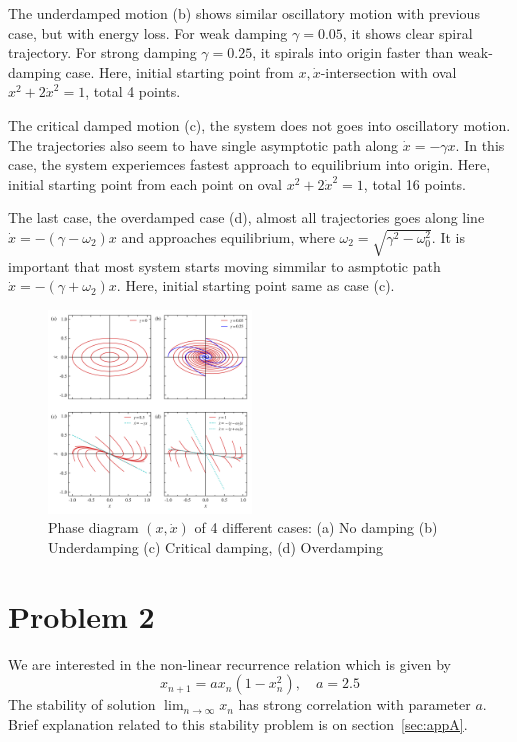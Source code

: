 \documentclass[reprint, nofootinbib]{revtex4-2} %
\begin{document}
The underdamped motion (b) shows similar oscillatory motion with previous case, but with energy loss. For weak damping $\gamma=0.05$, it shows clear spiral trajectory. For strong damping $\gamma=0.25$, it spirals into origin faster than weak-damping case. Here, initial starting point from $x, \dot{x}$-intersection with oval $x^2+2\dot{x}^2=1$, total 4 points.

The critical damped motion (c), the system does not goes into oscillatory motion. The trajectories also seem to have single asymptotic path along $\dot{x} = -\gamma x$. In this case, the system experiemces fastest approach to equilibrium into origin. Here, initial starting point from each point on oval $x^2+2\dot{x}^2=1$, total 16 points.

The last case, the overdamped case (d), almost all trajectories goes along line $\dot{x} = -(\gamma-\omega_2)x$ and approaches equilibrium, where $\omega_2 = \sqrt{\gamma^2-\omega_0^2}$. It is important that most system starts moving simmilar to asmptotic path $\dot{x} = -(\gamma+\omega_2)x$. Here, initial starting point same as case (c).

\begin{figure}[t]
	\includegraphics[width=0.48\textwidth]{fig1_add.png}
	\caption{Phase diagram $(x, \dot{x})$ of 4 different cases: (a) No damping (b) Underdamping (c) Critical damping, (d) Overdamping}
	\label{fig:fig1}
\end{figure}

\section{Problem 2}
We are interested in the non-linear recurrence relation which is given by
\begin{equation}\label{eqn:relation}
	x_{n+1} = a x_n(1-x_n^2), \quad a = 2.5
\end{equation}
The stability of solution $\lim_{n\to\infty}x_n$ has strong correlation with parameter $a$. Brief explanation related to this stability problem is on section~\ref{sec:appA}. 
\end{document}
